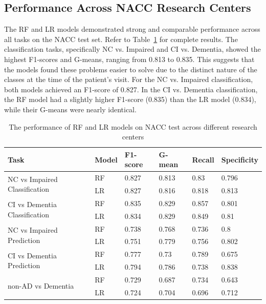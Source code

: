 \subsection{Performance Across NACC Research Centers}
The RF and LR models demonstrated strong and comparable performance across all tasks on the NACC test set. Refer to Table~\ref{table:nacc-test-results} for complete results. The classification tasks, specifically NC vs. Impaired and CI vs. Dementia, showed the highest F1-scores and G-means, ranging from 0.813 to 0.835. This suggests that the models found these problems easier to solve due to the distinct nature of the classes at the time of the patient's visit. For the NC vs. Impaired classification, both models achieved an F1-score of 0.827. In the CI vs. Dementia classification, the RF model had a slightly higher F1-score (0.835) than the LR model (0.834), while their G-means were nearly identical.

\begin{table}[!ht]
    \centering
    \caption{The performance of RF and LR models on NACC test across different research centers}
    \begin{tabular}{|l|l|l|l|l|l|}
    \hline
        Task & Model & F1-score & G-mean & Recall & Specificity \\ \hline
        \multirow{2}{*}{NC vs Impaired Classification} & RF & 0.827 & 0.813 & 0.83 & 0.796 \\
        ~ & LR & 0.827 & 0.816 & 0.818 & 0.813 \\ \hline
        \multirow{2}{*}{CI vs Dementia Classification} & RF & 0.835 & 0.829 & 0.857 & 0.801 \\
        ~ & LR & 0.834 & 0.829 & 0.849 & 0.81 \\ \hline
        \multirow{2}{*}{NC vs Impaired Prediction} & RF & 0.738 & 0.768 & 0.736 & 0.8 \\
        ~ & LR & 0.751 & 0.779 & 0.756 & 0.802 \\ \hline
        \multirow{2}{*}{CI vs Dementia Prediction} & RF & 0.777 & 0.73 & 0.789 & 0.675 \\
        ~ & LR & 0.794 & 0.786 & 0.738 & 0.838 \\ \hline
        \multirow{2}{*}{non-AD vs Dementia} & RF & 0.729 & 0.687 & 0.734 & 0.643 \\
        ~ & LR & 0.724 & 0.704 & 0.696 & 0.712 \\ \hline
    \end{tabular}
    \label{table:nacc-test-results}
\end{table}

